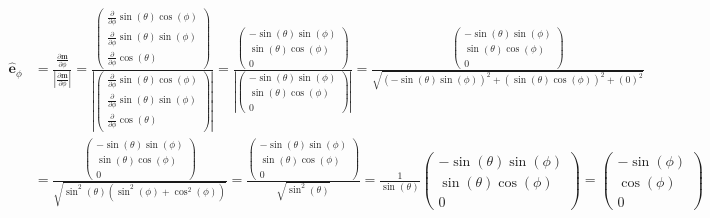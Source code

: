 \documentclass[reprint,amsmath,amssymb,aps, floatfix]{revtex4-2}
\begin{document}
\begin{widetext}
\begin{equation}
    \begin{aligned}
        \hat{\mathbf{e}}_{\phi} &= \frac{\frac{\partial \mathbf{m}}{\partial \phi}}{\left|\frac{\partial \mathbf{m}}{\partial \phi}\right|}
        = \frac{\begin{pmatrix} \frac{\partial}{\partial \phi} \sin(\theta)\cos(\phi) \\ \frac{\partial}{\partial \phi} \sin(\theta)\sin(\phi) \\ \frac{\partial}{\partial \phi} \cos(\theta) \end{pmatrix}}{\left|\begin{pmatrix} \frac{\partial}{\partial \phi} \sin(\theta)\cos(\phi) \\ \frac{\partial}{\partial \phi} \sin(\theta)\sin(\phi) \\ \frac{\partial}{\partial \phi} \cos(\theta) \end{pmatrix}\right|} 
        = \frac{\begin{pmatrix} -\sin(\theta)\sin(\phi) \\ \sin(\theta)\cos(\phi) \\ 0 \end{pmatrix}}{\left|\begin{pmatrix} -\sin(\theta)\sin(\phi) \\ \sin(\theta)\cos(\phi) \\ 0 \end{pmatrix}\right|}
        = \frac{\begin{pmatrix} -\sin(\theta)\sin(\phi) \\ \sin(\theta)\cos(\phi) \\ 0 \end{pmatrix}}{\sqrt{\left(-\sin(\theta)\sin(\phi)\right)^2 + \left(\sin(\theta)\cos(\phi)\right)^2 + \left(0\right)^2}} \\[1ex]
        & = \frac{\begin{pmatrix} -\sin(\theta)\sin(\phi) \\ \sin(\theta)\cos(\phi) \\ 0 \end{pmatrix}}{\sqrt{\sin^2(\theta)\left(\sin^2(\phi) + \cos^2(\phi)\right)}}
        = \frac{\begin{pmatrix} -\sin(\theta)\sin(\phi) \\ \sin(\theta)\cos(\phi) \\ 0 \end{pmatrix}}{\sqrt{\sin^2(\theta)}}
        = \frac{1}{\sin(\theta)} \begin{pmatrix} -\sin(\theta)\sin(\phi) \\ \sin(\theta)\cos(\phi) \\ 0 \end{pmatrix}
        = \begin{pmatrix} -\sin(\phi) \\ \cos(\phi) \\ 0 \end{pmatrix}
    \end{aligned}
    \label{equ:ephi}
\end{equation}


\end{widetext}
\end{document}
